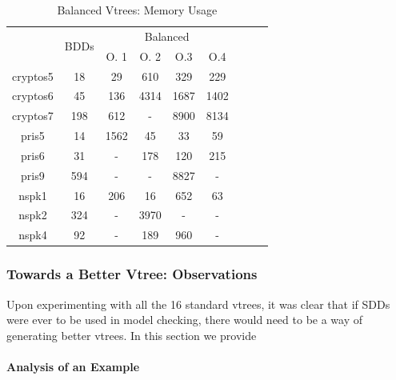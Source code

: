 \documentclass[11pt]{article}
\newcommand{\myparagraph}[1]{\paragraph{#1}\mbox{}\\}
\begin{document}
\begin{table}
\centering
\begin{tabular}{|*{9}{c|}}
\hline
 & \multirow{2}{*}{BDDs} & \multicolumn{4}{c|}{Balanced} \\ \cline{3-6}
 & & O. 1& O. 2 & O.3 & O.4 \\ \hline
cryptos5 & 18 & 29 & 610 & 329 & 229 \\ \hline
cryptos6 & 45 & 136 & 4314 & 1687 & 1402\\ \hline
cryptos7 & 198& 612 & - & 8900 & 8134 \\ \hline
pris5 & 14 & 1562 & 45 & 33& 59 \\\hline
pris6 &31 & - & 178 & 120& 215 \\ \hline
pris9 &594 & - & - & 8827& -\\ \hline
nspk1 & 16 & 206 & 16 & 652& 63 \\ \hline
nspk2 &324 & - & 3970 & - &- \\ \hline
nspk4 &92 & - & 189 & 960& - \\ \hline
\end{tabular}
\caption{Balanced Vtrees: Memory Usage}
\label{table:otherstandardvtrees2memory}
\end{table}


\subsubsection{Towards a Better Vtree: Observations}
\label{analysis_example}

Upon experimenting with all the 16 standard vtrees, it was clear that if SDDs were ever to be used in model checking, there would need to be a way of generating better vtrees. In this section we provide 


\myparagraph{Analysis of an Example}
\end{document}
